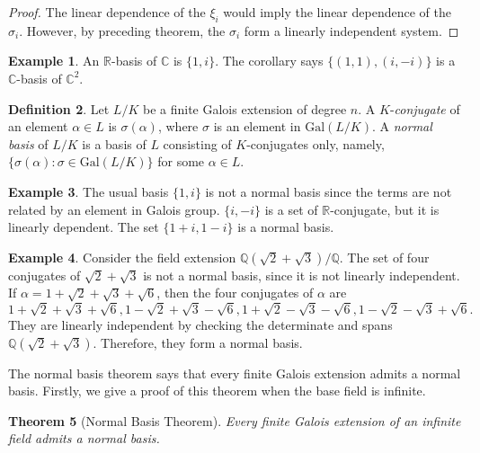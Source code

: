 \documentclass[12pt]{report}
\newtheorem{theorem}{Theorem}[section]
\theoremstyle{definition}
\newtheorem{definition}[theorem]{Definition}
\newtheorem{example}[theorem]{Example}
\newcommand{\Gal}{\text{Gal}}
\newcommand{\CC}{\mathbb{C}}
\newcommand{\QQ}{\mathbb{Q}}
\newcommand{\RR}{\mathbb{R}}
\begin{document}
\begin{proof}
	The linear dependence of the $\xi_i$ would imply the linear dependence of the $\sigma_i$. However, by preceding theorem, the $\sigma_i$ form a linearly independent system.
\end{proof}

\begin{example}
	An $\RR$-basis of $\CC$ is $\{1,i\}$. The corollary says $\{(1,1), (i,-i)\}$ is a $\CC$-basis of $\CC^2$.
\end{example}


\begin{definition}
	Let $L/K$ be a finite Galois extension of degree $n$. A $K$-\emph{conjugate} of an element $\alpha\in L$ is $\sigma(\alpha)$, where $\sigma$ is an element in $\Gal(L/K)$. A \emph{normal basis} of $L/K$ is a basis of $L$ consisting of $K$-conjugates only, namely,  $\{\sigma(\alpha):\sigma\in \Gal(L/K)\}$ for some $\alpha\in L$.
\end{definition}

\begin{example}
	The usual basis $\{1,i\}$ is not a normal basis since the terms are not related by an element in Galois group. $\{i,-i\}$ is a set of $\RR$-conjugate, but it is linearly dependent. The set $\{1+i,1-i\}$ is a normal basis.
\end{example}

\begin{example}
	Consider the field extension $\QQ(\sqrt{2}+\sqrt{3})/\QQ$. The set of four conjugates of $\sqrt{2}+\sqrt{3}$ is not a normal basis, since it is not linearly independent. If $\alpha=1+\sqrt{2}+\sqrt{3}+\sqrt{6}$, then the four conjugates of $\alpha$ are
	$$1+\sqrt{2}+\sqrt{3}+\sqrt{6},1-\sqrt{2}+\sqrt{3}-\sqrt{6},1+\sqrt{2}-\sqrt{3}-\sqrt{6},1-\sqrt{2}-\sqrt{3}+\sqrt{6}.$$ They are linearly independent by checking the determinate and spans $\QQ(\sqrt{2}+\sqrt{3})$. Therefore, they form a normal basis.
\end{example}

The normal basis theorem says that every finite Galois extension admits a normal basis. Firstly, we  give a proof of this theorem when the base field is infinite.

\begin{theorem}[Normal Basis Theorem]
	Every finite Galois extension of an infinite field admits a normal basis.
\end{theorem}
\end{document}
